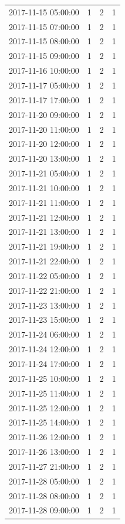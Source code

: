 \begin{tabular}{lrrr}
2017-11-15 05:00:00 & 1 & 2 & 1 \\
2017-11-15 07:00:00 & 1 & 2 & 1 \\
2017-11-15 08:00:00 & 1 & 2 & 1 \\
2017-11-15 09:00:00 & 1 & 2 & 1 \\
2017-11-16 10:00:00 & 1 & 2 & 1 \\
2017-11-17 05:00:00 & 1 & 2 & 1 \\
2017-11-17 17:00:00 & 1 & 2 & 1 \\
2017-11-20 09:00:00 & 1 & 2 & 1 \\
2017-11-20 11:00:00 & 1 & 2 & 1 \\
2017-11-20 12:00:00 & 1 & 2 & 1 \\
2017-11-20 13:00:00 & 1 & 2 & 1 \\
2017-11-21 05:00:00 & 1 & 2 & 1 \\
2017-11-21 10:00:00 & 1 & 2 & 1 \\
2017-11-21 11:00:00 & 1 & 2 & 1 \\
2017-11-21 12:00:00 & 1 & 2 & 1 \\
2017-11-21 13:00:00 & 1 & 2 & 1 \\
2017-11-21 19:00:00 & 1 & 2 & 1 \\
2017-11-21 22:00:00 & 1 & 2 & 1 \\
2017-11-22 05:00:00 & 1 & 2 & 1 \\
2017-11-22 21:00:00 & 1 & 2 & 1 \\
2017-11-23 13:00:00 & 1 & 2 & 1 \\
2017-11-23 15:00:00 & 1 & 2 & 1 \\
2017-11-24 06:00:00 & 1 & 2 & 1 \\
2017-11-24 12:00:00 & 1 & 2 & 1 \\
2017-11-24 17:00:00 & 1 & 2 & 1 \\
2017-11-25 10:00:00 & 1 & 2 & 1 \\
2017-11-25 11:00:00 & 1 & 2 & 1 \\
2017-11-25 12:00:00 & 1 & 2 & 1 \\
2017-11-25 14:00:00 & 1 & 2 & 1 \\
2017-11-26 12:00:00 & 1 & 2 & 1 \\
2017-11-26 13:00:00 & 1 & 2 & 1 \\
2017-11-27 21:00:00 & 1 & 2 & 1 \\
2017-11-28 05:00:00 & 1 & 2 & 1 \\
2017-11-28 08:00:00 & 1 & 2 & 1 \\
2017-11-28 09:00:00 & 1 & 2 & 1 \\

\end{tabular}
